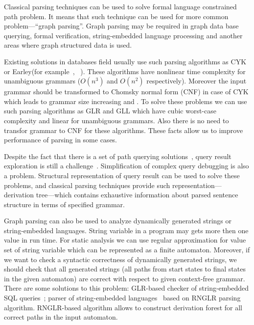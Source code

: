 \documentclass{sig-alternate} %
\begin{document}
Classical parsing techniques can be used to solve formal language constrained path problem. 
It means that such technique can be used for more common problem---``graph parsing''. 
Graph parsing may be required in graph data base querying, formal verification, string-embedded language processing and another areas where graph structured data is used. 

Existing solutions in databases field usually use such parsing algorithms as CYK or Earley(for example~\cite{ConjCFPathQuery}, ~\cite{GraphQueryWithEarley}). 
These algorithms have nonlinear time complexity for unambiguous grammars ($O(n^3)$ and $O(n^2)$ respectively).
Moreover the input grammar should be transformed to Chomsky normal form (CNF) in case of CYK which leads to grammar size increasing and .
To solve these problems we can use such parsing algorithms as GLR and GLL which have cubic worst-case complexity and linear for unambiguous grammars.
Also there is no need to transfor grammar to CNF for these algorithms.
These facts allow us to improve performance of parsing in some cases.

Despite the fact that there is a set of path querying solutions~\cite{GraphQueryWithEarley, ConjCFPathQuery, !!!}, query result exploration is still a challenge~\cite{hofman2015separabilityForRegQueryDebugging}. 
Simplification of complex query debugging is also a problem.
Structural representation of query result can be used to solve these problems, and classical parsing techniques provide such representation---derivation tree---which contains exhaustive information about parsed sentence structure in terms of specified grammar.

Graph parsing can also be used to analyze dynamically generated strings or string-embedded languages. 
String variable in a program may gets more then one value in run time.
For static analysis we can use regular approximation for value set of string variable which can be represented as a finite automaton.
Moreover, if we want to check a syntactic correctness of dynamically generated strings, we should check that all generated strings (all paths from start states to final states in the given automaton) are correct with respect to given context-free grammar. 
There are some solutions to this problem: GLR-based checker of string-embedded SQL queries~\cite{Alvor1, Alvor2};
 parser of string-embedded languages~\cite{relaxedRNGLR} based on RNGLR parsing algorithm.
RNGLR-based algorithm allows to construct derivation forest for all correct paths in the input automaton.
\end{document}
